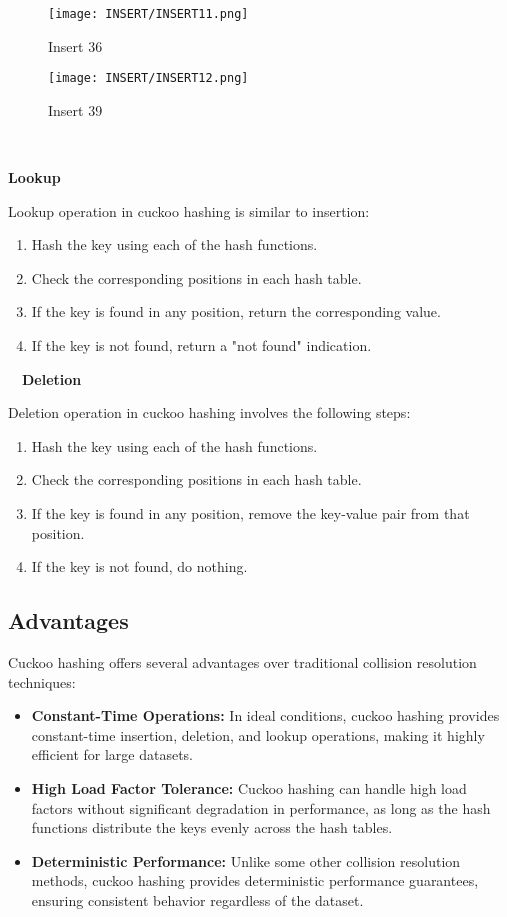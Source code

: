 \documentclass[12pt]{article}
\begin{document}
\begin{figure}[htbp]
    \centering
    \texttt{[image: INSERT/INSERT11.png]}
    \caption{Insert 36}
    \label{fig:insertion_step1}
\end{figure}


\begin{figure}[htbp]
    \centering
    \texttt{[image: INSERT/INSERT12.png]}
    \caption{Insert 39}
    \label{fig:insertion_step1}
\end{figure}
\ \ \

\newpage


\textbf{Lookup}

Lookup operation in cuckoo hashing is similar to insertion:

\begin{enumerate}
    \item Hash the key using each of the hash functions.
    \item Check the corresponding positions in each hash table.
    \item If the key is found in any position, return the corresponding value.
    \item If the key is not found, return a "not found" indication.
\end{enumerate}
\  \
\textbf{Deletion}

Deletion operation in cuckoo hashing involves the following steps:

\begin{enumerate}
    \item Hash the key using each of the hash functions.
    \item Check the corresponding positions in each hash table.
    \item If the key is found in any position, remove the key-value pair from that position.
    \item If the key is not found, do nothing.
\end{enumerate}

\subsection{Advantages}

Cuckoo hashing offers several advantages over traditional collision resolution techniques:

\begin{itemize}
    \item \textbf{Constant-Time Operations:} In ideal conditions, cuckoo hashing provides constant-time insertion, deletion, and lookup operations, making it highly efficient for large datasets.
    \item \textbf{High Load Factor Tolerance:} Cuckoo hashing can handle high load factors without significant degradation in performance, as long as the hash functions distribute the keys evenly across the hash tables.
    \item \textbf{Deterministic Performance:} Unlike some other collision resolution methods, cuckoo hashing provides deterministic performance guarantees, ensuring consistent behavior regardless of the dataset.
\end{itemize}
\end{document}
